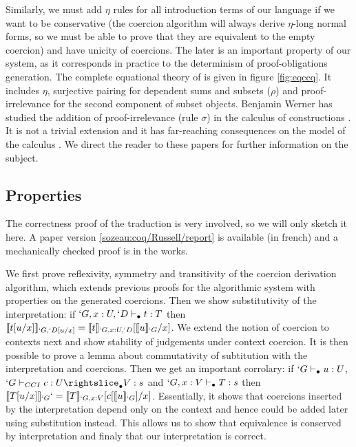 \documentclass{llncs}
\begin{document}
Similarly, we must add $\eta$ rules for all introduction terms of our
language if we want to be conservative (the coercion algorithm will
always derive $\eta$-long normal forms, so we must be able to prove that they
are equivalent to the empty coercion) and have unicity of
coercions. The later is an important property of our system, as it
corresponds in practice to the determinism of proof-obligations
generation. The complete equational theory of \CCq{} is given in figure
\vref{fig:eqccq}. It includes $\eta$, surjective pairing for dependent
sums and subsets ($\rho$) and proof-irrelevance for the second component
of subset objects.
Benjamin Werner has studied the addition of proof-irrelevance (rule
$\sigma$) in the calculus of constructions
\cite{Werner:ProofIrrelevance}. It is not a trivial extension and it has
far-reaching consequences on the model of the calculus
\cite{DBLP:conf/types/MiquelW02}. We direct the reader to these papers for further
information on the subject.


\subsection{Properties}
The correctness proof of the traduction is very involved, so we will
only sketch it here. A paper version \vref{sozeau:coq/Russell/report} is
available (in french) and a mechanically checked proof is in the works.


We first prove reflexivity, symmetry and transitivity of the coercion
derivation algorithm, which extends previous proofs for the algorithmic
system with properties on
the generated coercions. Then we show substitutivity of the
interpretation: if $`G, x : U, `D \vdash_{\bullet} t : T$ then $\llbracket t[u/x] \rrbracket_{`G,
 `D[u/x]} = \llbracket t \rrbracket_{`G, x : U, `D}[\llbracket u \rrbracket_{`G}/x]$. We extend the notion
of coercion to contexts next and show stability of judgements under
context coercion. It is then possible to prove a lemma about commutativity of
subtitution with the interpretation and coercions. Then we get an
important corrolary: if $`G \vdash_{\bullet} u : U$, $\subimpl{`G}{c}{U}{V}{s}$ and
$`G, x : V \vdash_{\bullet} T : s$ then $\llbracket T[u/x] \rrbracket_{`G} `= \llbracket T \rrbracket_{`G, x :
  V}[c[\llbracket u \rrbracket_{`G}]/x]$. Essentially, it shows that coercions inserted
by the interpretation depend only on the context and hence could be
added later using substitution instead. This allows us to show that
equivalence is conserved by interpretation and finaly that our
interpretation is correct.
\end{document}
